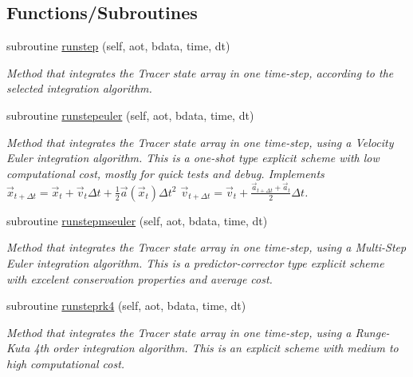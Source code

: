 \subsection*{Functions/\+Subroutines}
\begin{DoxyCompactItemize}
\item 
subroutine \mbox{\hyperlink{namespacesolver__mod_ab87d71c6c8aa1709901ec14f9bf12505}{runstep}} (self, aot, bdata, time, dt)
\begin{DoxyCompactList}\small\item\em Method that integrates the Tracer state array in one time-\/step, according to the selected integration algorithm. \end{DoxyCompactList}\item 
subroutine \mbox{\hyperlink{namespacesolver__mod_a1c6bb2899a5ce28d6b63f1d0e67d2b92}{runstepeuler}} (self, aot, bdata, time, dt)
\begin{DoxyCompactList}\small\item\em Method that integrates the Tracer state array in one time-\/step, using a Velocity Euler integration algorithm. This is a one-\/shot type explicit scheme with low computational cost, mostly for quick tests and debug. Implements $ {\vec {x}}_{t+\Delta t}={\vec {x}}_{t}+{\vec {v}}_{t}\Delta t+{\frac {1}{2}}{\vec {a}}({\vec {x}}_{t})\Delta t^{2}$ $ {\vec {v}}_{t+\Delta t}={\vec {v}}_{t}+\frac{{\vec {a}}_{t+\Delta t}+{\vec {a}}_{t}}{2}\Delta t$. \end{DoxyCompactList}\item 
subroutine \mbox{\hyperlink{namespacesolver__mod_a799bf8b0b57a431b29c8dbeef9be6e48}{runstepmseuler}} (self, aot, bdata, time, dt)
\begin{DoxyCompactList}\small\item\em Method that integrates the Tracer state array in one time-\/step, using a Multi-\/\+Step Euler integration algorithm. This is a predictor-\/corrector type explicit scheme with excelent conservation properties and average cost. \end{DoxyCompactList}\item 
subroutine \mbox{\hyperlink{namespacesolver__mod_ae59da54f053ae369d76f130b3790f3b7}{runsteprk4}} (self, aot, bdata, time, dt)
\begin{DoxyCompactList}\small\item\em Method that integrates the Tracer state array in one time-\/step, using a Runge-\/\+Kuta 4th order integration algorithm. This is an explicit scheme with medium to high computational cost. \end{DoxyCompactList}\item 

\end{DoxyCompactItemize}
